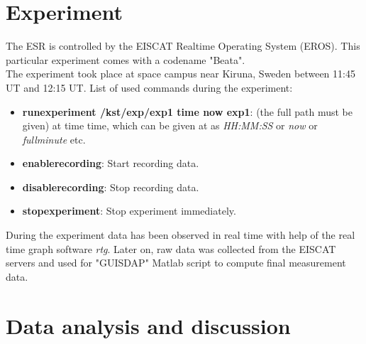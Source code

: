 \documentclass{article}
\begin{document}

\section{Experiment}

The ESR is controlled by the EISCAT Realtime Operating System (EROS). This particular experiment comes with a codename "Beata".\\
The experiment took place at space campus near Kiruna, Sweden between 11:45 UT and 12:15 UT.
List of used commands during the experiment:
\begin{itemize}
\item \textbf{runexperiment /kst/exp/exp1 time now exp1}: (the full path must be given) at time time, which can be given at as \emph{HH:MM:SS} or \emph{now} or \emph{fullminute} etc.
\item \textbf{enablerecording}: Start recording data.
\item \textbf{disablerecording}: Stop recording data.
\item \textbf{stopexperiment}: Stop experiment immediately.
\end{itemize}
During the experiment data has been observed in real time with help of the real time graph software \emph{rtg}. Later on, raw data was collected from the EISCAT servers and used for "GUISDAP" Matlab script to compute final measurement data.


\section{Data analysis and discussion}
\end{document}
